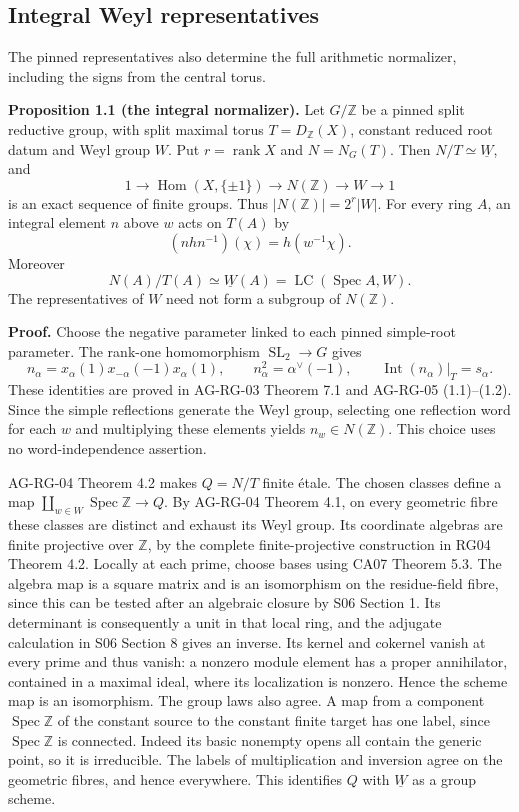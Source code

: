 \documentclass[11pt,a4paper,openany]{report}
\newcounter{none}
\begin{document}
\subsection{Integral Weyl representatives}\label{AG-RG-05-integral-weyl-representatives}

The pinned representatives also determine the full arithmetic normalizer, including the signs from the central torus.

\textbf{Proposition 1.1 (the integral normalizer).} Let \(G/\mathbb Z\) be a pinned split reductive group, with split maximal torus \(T=D_{\mathbb Z}(X)\), constant reduced root datum and Weyl group \(W\). Put \(r=\operatorname{rank}X\) and \(N=N_G(T)\). Then \(N/T\simeq\underline W\), and \[
1\longrightarrow\operatorname{Hom}(X,\{\pm1\})
\longrightarrow N(\mathbb Z)\longrightarrow W\longrightarrow1
\] is an exact sequence of finite groups. Thus \(|N(\mathbb Z)|=2^r|W|\). For every ring \(A\), an integral element \(n\) above \(w\) acts on \(T(A)\) by \[
(nhn^{-1})(\chi)=h(w^{-1}\chi).
\] Moreover \[
N(A)/T(A)\simeq\underline W(A)
=\operatorname{LC}(\operatorname{Spec}A,W).
\] The representatives of \(W\) need not form a subgroup of \(N(\mathbb Z)\).

\textbf{Proof.} Choose the negative parameter linked to each pinned simple-root parameter. The rank-one homomorphism \(\operatorname{SL}_2\to G\) gives \[
n_\alpha=x_\alpha(1)x_{-\alpha}(-1)x_\alpha(1),
\qquad n_\alpha^2=\alpha^\vee(-1),
\qquad\operatorname{Int}(n_\alpha)|_T=s_\alpha.
\] These identities are proved in AG-RG-03 Theorem 7.1 and AG-RG-05 (1.1)--(1.2). Since the simple reflections generate the Weyl group, selecting one reflection word for each \(w\) and multiplying these elements yields \(n_w\in N(\mathbb Z)\). This choice uses no word-independence assertion.

AG-RG-04 Theorem 4.2 makes \(Q=N/T\) finite étale. The chosen classes define a map \(\coprod_{w\in W}\operatorname{Spec}\mathbb Z\to Q\). By AG-RG-04 Theorem 4.1, on every geometric fibre these classes are distinct and exhaust its Weyl group. Its coordinate algebras are finite projective over \(\mathbb Z\), by the complete finite-projective construction in RG04 Theorem 4.2. Locally at each prime, choose bases using CA07 Theorem 5.3. The algebra map is a square matrix and is an isomorphism on the residue-field fibre, since this can be tested after an algebraic closure by S06 Section 1. Its determinant is consequently a unit in that local ring, and the adjugate calculation in S06 Section 8 gives an inverse. Its kernel and cokernel vanish at every prime and thus vanish: a nonzero module element has a proper annihilator, contained in a maximal ideal, where its localization is nonzero. Hence the scheme map is an isomorphism. The group laws also agree. A map from a component \(\operatorname{Spec}\mathbb Z\) of the constant source to the constant finite target has one label, since \(\operatorname{Spec}\mathbb Z\) is connected. Indeed its basic nonempty opens all contain the generic point, so it is irreducible. The labels of multiplication and inversion agree on the geometric fibres, and hence everywhere. This identifies \(Q\) with \(\underline W\) as a group scheme.
\end{document}
